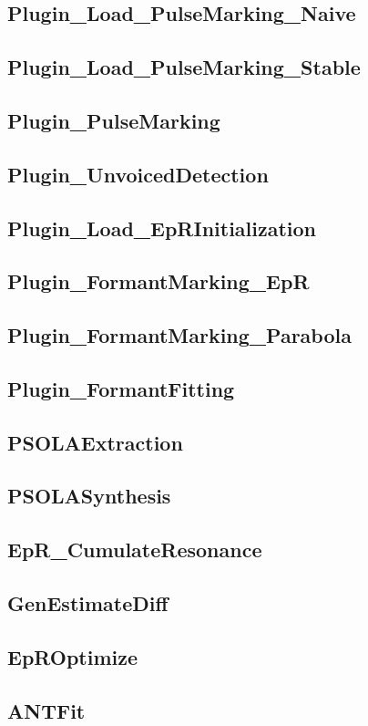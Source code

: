 \subsection{Plugin\_Load\_PulseMarking\_Naive}

\subsection{Plugin\_Load\_PulseMarking\_Stable}

\subsection{Plugin\_PulseMarking}

\subsection{Plugin\_UnvoicedDetection}

\subsection{Plugin\_Load\_EpRInitialization}

\subsection{Plugin\_FormantMarking\_EpR}

\subsection{Plugin\_FormantMarking\_Parabola}

\subsection{Plugin\_FormantFitting}

\subsection{PSOLAExtraction}

\subsection{PSOLASynthesis}

\subsection{EpR\_CumulateResonance}

\subsection{GenEstimateDiff}

\subsection{EpROptimize}

\subsection{ANTFit}


